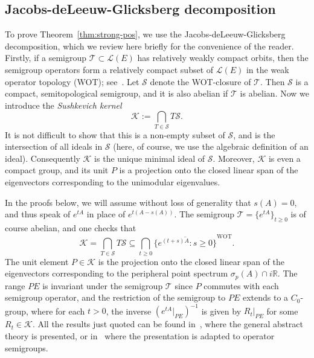 \documentclass[a4paper, reqno]{amsart}
\numberwithin{equation}{section}
\theoremstyle{plain}
\theoremstyle{definition}
\theoremstyle{remark}
\newcommand{\RR}{\mathbb{R}}
\begin{document}
\subsection*{Jacobs-deLeeuw-Glicksberg decomposition}
\label{subsec:JdLG}
To prove Theorem~\ref{thm:strong-pos}, we use the Jacobs-deLeeuw-Glicksberg decomposition, which we review here briefly for the convenience of the reader. Firstly, if a semigroup $\mathcal{T}\subset\mathcal{L}(E)$ has relatively weakly compact orbits, then the semigroup operators form a relatively compact subset of $\mathcal{L}(E)$ in the weak operator topology (WOT); see~\cite[Section 2.4, Lemma 4.2]{Kr}. Let $\mathcal{S}$ denote the WOT-closure of $\mathcal{T}$. Then $\mathcal{S}$ is a compact, semitopological semigroup, and it is also abelian if $\mathcal{T}$ is abelian. Now we introduce the \emph{Sushkevich kernel}
\begin{equation}
	\mathcal{K} := \bigcap_{T\in\mathcal{S}} T\mathcal{S}.
\end{equation}
It is not difficult to show that this is a non-empty subset of $\mathcal{S}$, and is the intersection of all ideals in $\mathcal{S}$ (here, of course, we use the algebraic definition of an ideal). Consequently $\mathcal{K}$ is the unique minimal ideal of $\mathcal{S}$. Moreover, $\mathcal{K}$ is even a compact group, and its unit $P$ is a projection onto the closed linear span of the eigenvectors corresponding to the unimodular eigenvalues.

In the proofs below, we will assume without loss of generality that $s(A)=0$, and thus speak of $e^{tA}$ in place of $e^{t(A-s(A))}$. The semigroup $\mathcal{T}=\{e^{tA}\}_{t\ge 0}$ is of course abelian, and one checks that
\begin{equation}
\label{eq:K-kernel}
	\mathcal{K} = \bigcap_{T\in\mathcal{S}} T\mathcal{S} \subseteq \bigcap_{t\ge 0} \overline{\{e^{(t+s)A}:s \ge 0\}}^{\text{WOT}}.
\end{equation}
The unit element $P\in\mathcal{K}$ is the projection onto the closed linear span of the eigenvectors corresponding to the peripheral point spectrum $\sigma_p(A)\cap i\RR$. The range $PE$ is invariant under the semigroup $\mathcal{T}$ since $P$ commutes with each semigroup operator, and the restriction of the semigroup to $PE$ extends to a $C_0$-group, where for each $t>0$, the inverse $(e^{tA}|_{PE})^{-1}$ is given by ${R_t}|_{PE}$ for some $R_t\in\mathcal{K}$.  All the results just quoted can be found in~\cite[Section 2.4]{Kr}, where the general abstract theory is presented, or in~\cite[Section V.2]{EN00} where the presentation is adapted to operator semigroups.
\end{document}
